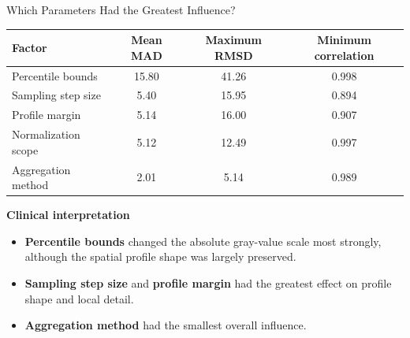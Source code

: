 \documentclass[aspectratio=169]{beamer}
\begin{document}
\begin{frame}{Which Parameters Had the Greatest Influence?}

\small

\begin{table}
\centering
\begin{tabular}{lccc}
\toprule
Factor &
Mean MAD &
Maximum RMSD &
Minimum correlation\\
\midrule
Percentile bounds & 15.80 & 41.26 & 0.998\\
Sampling step size & 5.40 & 15.95 & 0.894\\
Profile margin & 5.14 & 16.00 & 0.907\\
Normalization scope & 5.12 & 12.49 & 0.997\\
Aggregation method & 2.01 & 5.14 & 0.989\\
\bottomrule
\end{tabular}
\end{table}

\vspace{0.3cm}

\textbf{Clinical interpretation}

\begin{itemize}
    \item \textbf{Percentile bounds} changed the absolute gray-value scale most
    strongly, although the spatial profile shape was largely preserved.
    \item \textbf{Sampling step size} and \textbf{profile margin} had the
    greatest effect on profile shape and local detail.
    \item \textbf{Aggregation method} had the smallest overall influence.
\end{itemize}

\end{frame}
\end{document}
